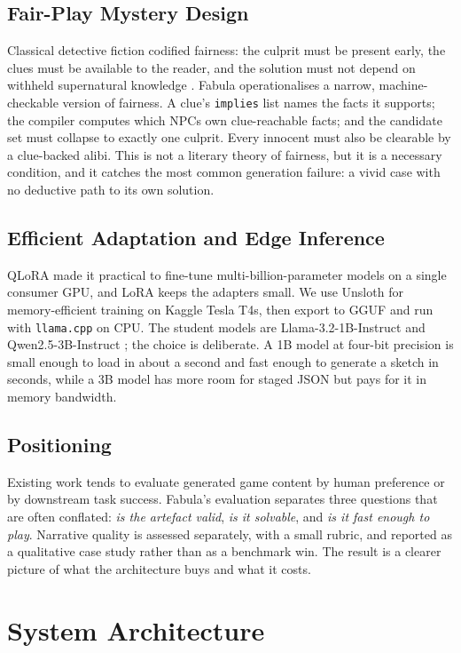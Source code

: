 ﻿\documentclass[11pt,a4paper]{report}
\begin{document}
\section{Fair-Play Mystery Design}
Classical detective fiction codified fairness: the culprit must be present early, the clues must be available to the reader, and the solution must not depend on withheld supernatural knowledge \cite{knox1929decalogue,vandine1928rules}. Fabula operationalises a narrow, machine-checkable version of fairness. A clue's \texttt{implies} list names the facts it supports; the compiler computes which NPCs own clue-reachable facts; and the candidate set must collapse to exactly one culprit. Every innocent must also be clearable by a clue-backed alibi. This is not a literary theory of fairness, but it is a necessary condition, and it catches the most common generation failure: a vivid case with no deductive path to its own solution.

\section{Efficient Adaptation and Edge Inference}
QLoRA \cite{dettmers2023qlora} made it practical to fine-tune multi-billion-parameter models on a single consumer GPU, and LoRA \cite{hu2022lora} keeps the adapters small. We use Unsloth \cite{unsloth} for memory-efficient training on Kaggle Tesla T4s, then export to GGUF and run with \texttt{llama.cpp} \cite{llamacpp} on CPU. The student models are Llama-3.2-1B-Instruct \cite{llama3herd} and Qwen2.5-3B-Instruct \cite{qwen2025}; the choice is deliberate. A 1B model at four-bit precision is small enough to load in about a second and fast enough to generate a sketch in seconds, while a 3B model has more room for staged JSON but pays for it in memory bandwidth.

\section{Positioning}
Existing work tends to evaluate generated game content by human preference or by downstream task success. Fabula's evaluation separates three questions that are often conflated: \emph{is the artefact valid}, \emph{is it solvable}, and \emph{is it fast enough to play}. Narrative quality is assessed separately, with a small rubric, and reported as a qualitative case study rather than as a benchmark win. The result is a clearer picture of what the architecture buys and what it costs.

\chapter{System Architecture}
\label{ch:architecture}
\end{document}
